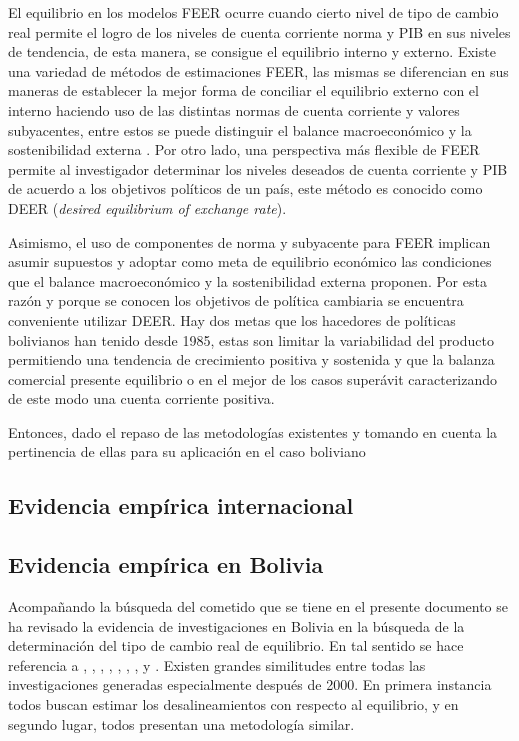 \documentclass[12pt,letterpaper]{article}
\begin{document}
El equilibrio en los modelos FEER ocurre cuando cierto nivel de tipo de cambio real permite el logro de los niveles de cuenta corriente norma y PIB en sus niveles de tendencia, de esta manera, se consigue el equilibrio interno y externo. Existe una variedad de métodos de estimaciones FEER, las mismas se diferencian en sus maneras de establecer la mejor forma de conciliar el equilibrio externo con el interno haciendo uso de las distintas normas de cuenta corriente y valores subyacentes, entre estos se puede distinguir el balance macroeconómico y la sostenibilidad externa \citep{bussiere2010methodological}. Por otro lado, una perspectiva más flexible de FEER permite al investigador determinar los niveles deseados de cuenta corriente y PIB de acuerdo a los objetivos políticos de un país, este método es conocido como DEER (\emph{desired equilibrium of exchange rate}).

Asimismo, el uso de componentes de norma y subyacente para FEER implican asumir supuestos y adoptar como meta de equilibrio económico las condiciones que el balance macroeconómico y la sostenibilidad externa proponen. Por esta razón y porque se conocen los objetivos de política cambiaria se encuentra conveniente utilizar DEER. Hay dos metas que los hacedores de políticas bolivianos han tenido desde 1985, estas son limitar la variabilidad del producto permitiendo una tendencia de crecimiento positiva y sostenida y que la balanza comercial presente equilibrio o en el mejor de los casos superávit caracterizando de este modo una cuenta corriente positiva.

Entonces, dado el repaso de las metodologías existentes y tomando en cuenta la pertinencia de ellas para su aplicación en el caso boliviano

\subsection*{Evidencia empírica internacional}


\subsection*{Evidencia empírica en Bolivia}
Acompañando la búsqueda del cometido que se tiene en el presente documento se ha revisado la evidencia de investigaciones en Bolivia en la búsqueda de la determinación del tipo de cambio real de equilibrio. En tal sentido se hace referencia a \cite{ferrufino1992tipo}, \cite{aguilar2003estimacion}, \cite{humerez2005reexaminando}, \cite{montiel2007equilibrium}, \cite{cerutti2008}, \cite{mendieta2008equilibrio}, \cite{bello2010tipo}, \cite{cerezo2010desempeno} y \cite{cerezo2011tipo}. Existen grandes similitudes entre todas las investigaciones generadas especialmente después de 2000. En primera instancia todos buscan estimar los desalineamientos con respecto al equilibrio, y en segundo lugar, todos presentan una metodología similar.
\end{document}
